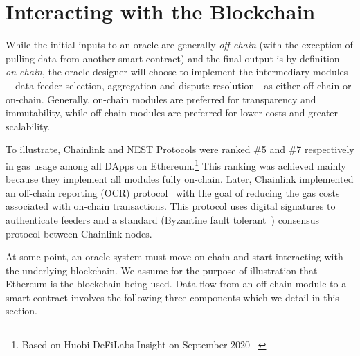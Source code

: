 

\section{Interacting with the Blockchain}\label{Interoperability}

While the initial inputs to an oracle are generally \textit{off-chain} (with the exception of pulling data from another smart contract) and the final output is by definition \textit{on-chain}, the oracle designer will choose to implement the intermediary modules---data feeder selection, aggregation and dispute resolution---as either off-chain or on-chain. Generally, on-chain modules are preferred for transparency and immutability, while off-chain modules are preferred for lower costs and greater scalability. 

To illustrate, Chainlink and NEST Protocols were ranked \#5 and \#7 respectively in gas usage among all DApps on Ethereum.\footnote{Based on Huobi DeFiLabs Insight on September 2020 ~\cite{huobiDeFiLabs}} This ranking was achieved mainly because they implement all modules fully on-chain. Later, Chainlink implemented an off-chain reporting (OCR) protocol~\cite{chainlinkocr} with the goal of reducing the gas costs associated with on-chain transactions. This protocol uses digital signatures to authenticate feeders and a standard (\eg Byzantine fault tolerant~\cite{castro2002practical}) consensus protocol between Chainlink nodes.

At some point, an oracle system must move on-chain and start interacting with the underlying blockchain. We assume for the purpose of illustration that Ethereum is the blockchain being used. Data flow from an off-chain module to a smart contract involves the following three components which we detail in this section. 

